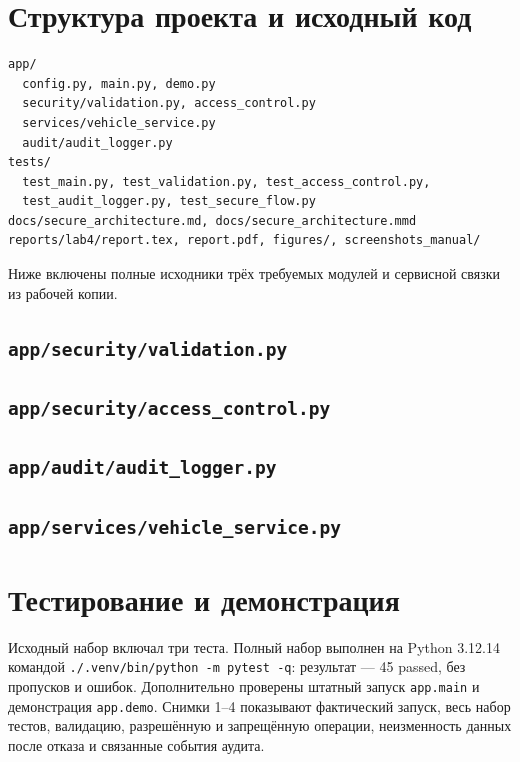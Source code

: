 \documentclass[12pt,a4paper]{article}
\begin{document}
\section{Структура проекта и исходный код}
\begin{lstlisting}
app/
  config.py, main.py, demo.py
  security/validation.py, access_control.py
  services/vehicle_service.py
  audit/audit_logger.py
tests/
  test_main.py, test_validation.py, test_access_control.py,
  test_audit_logger.py, test_secure_flow.py
docs/secure_architecture.md, docs/secure_architecture.mmd
reports/lab4/report.tex, report.pdf, figures/, screenshots_manual/
\end{lstlisting}

Ниже включены полные исходники трёх требуемых модулей и сервисной связки из рабочей копии.
\subsection{\texttt{app/security/validation.py}}

\subsection{\texttt{app/security/access\_control.py}}

\subsection{\texttt{app/audit/audit\_logger.py}}

\subsection{\texttt{app/services/vehicle\_service.py}}


\section{Тестирование и демонстрация}
Исходный набор включал три теста. Полный набор выполнен на Python 3.12.14 командой \texttt{./.venv/bin/python -m pytest -q}: результат — 45 passed, без пропусков и ошибок. Дополнительно проверены штатный запуск \texttt{app.main} и демонстрация \texttt{app.demo}. Снимки 1–4 показывают фактический запуск, весь набор тестов, валидацию, разрешённую и запрещённую операции, неизменность данных после отказа и связанные события аудита.
\end{document}
